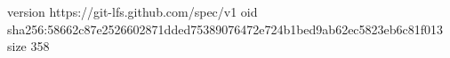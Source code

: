 version https://git-lfs.github.com/spec/v1
oid sha256:58662c87e2526602871dded75389076472e724b1bed9ab62ec5823eb6c81f013
size 358
